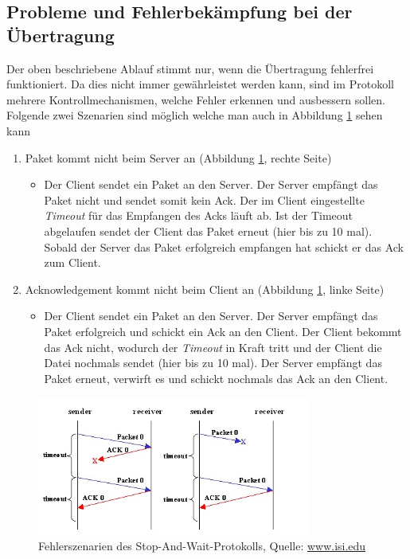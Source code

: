 \documentclass[a4paper, 12pt]{scrartcl}
\begin{document}
\subsection{Probleme und Fehlerbekämpfung bei der Übertragung}
Der oben beschriebene Ablauf stimmt nur, wenn die Übertragung fehlerfrei funktioniert. Da dies nicht immer gewährleistet werden kann, sind im Protokoll mehrere Kontrollmechanismen, welche Fehler erkennen und ausbessern sollen.\\
Folgende zwei Szenarien sind möglich welche man auch in Abbildung \ref{stop_n_wait_fail} sehen kann
\begin{enumerate}
\item Paket kommt nicht beim Server an (Abbildung \ref{stop_n_wait_fail}, rechte Seite)
\begin{itemize}
\item Der Client sendet ein Paket an den Server. Der Server empfängt das Paket nicht und sendet somit kein Ack. Der im Client eingestellte \textit{Timeout} für das Empfangen des Acks läuft ab. Ist der Timeout abgelaufen sendet der Client das Paket erneut (hier bis zu 10 mal). Sobald der Server das Paket erfolgreich empfangen hat schickt er das Ack zum Client.
\end{itemize}
\item Acknowledgement kommt nicht beim Client an (Abbildung \ref{stop_n_wait_fail}, linke Seite)
\begin{itemize}
\item Der Client sendet ein Paket an den Server. Der Server empfängt das Paket erfolgreich und schickt ein Ack an den Client. Der Client bekommt das Ack nicht, wodurch der \textit{Timeout} in Kraft tritt und der Client die Datei nochmals sendet (hier bis zu 10 mal). Der Server empfängt das Paket erneut, verwirft es und schickt nochmals das Ack an den Client. 
\end{itemize}
\end{enumerate}
\begin{figure}[htbp] 
  \centering
     \includegraphics[width=0.8\textwidth]{e-stop1.jpg}
  \caption{Fehlerszenarien des Stop-And-Wait-Protokolls, Quelle: \href{http://www.isi.edu/nsnam/DIRECTED_RESEARCH/DR_HYUNAH/D-Research/e-stop1.gif}{www.isi.edu}}

  \label{stop_n_wait_fail}
\end{figure}
\newpage
\end{document}
